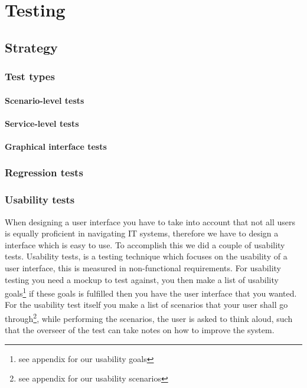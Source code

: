 \chapter{Testing}
\label{Testing}

\section{Strategy}
\label{Testing_Strategy}

\subsection{Test types}
\label{Testing_Strategy_Types}

\subsubsection{Scenario-level tests}
\label{Testing_Strategy_Types_Scenario}

\subsubsection{Service-level tests}
\label{Testing_Strategy_Types_Service}

\subsubsection{Graphical interface tests}
\label{Testing_Strategy_Types_EndUser}

\subsection{Regression tests}
\label{Testing_Strategy_Regression}

\subsection{Usability tests}
\label{Testing_Strategy_Usability}
When designing a user interface you have to take into account that not all users is equally proficient in navigating IT systems, therefore we have to design a interface which is easy to use. To accomplish this we did a couple of usability tests. Usability tests, is a testing technique which focuses on the usability of a user interface, this is measured in non-functional requirements. For usability testing you need a mockup to test against, you then make a list of usability goals\footnote{see appendix for our usability goals} if these goals is fulfilled then you have the user interface that you wanted. For the usability test itself you make a list of scenarios that your user shall go through\footnote{see appendix for our usability scenarios}, while performing the scenarios, the user is asked to think aloud, such that the overseer of the test can take notes on how to improve the system.

